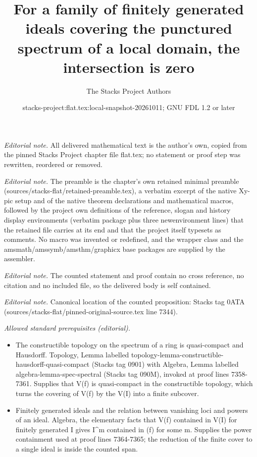 \documentclass[10pt,a4paper]{amsart}
\title{For a family of finitely generated ideals covering the punctured spectrum of a local domain, the intersection is zero}
\author{The Stacks Project Authors}
\date{stacks-project:flat.tex:local-snapshot-20261011; GNU FDL 1.2 or later}
\theoremstyle{plain}
\theoremstyle{definition}
\theoremstyle{remark}
\numberwithin{equation}{subsection}
\begin{document}
\maketitle
\noindent\textit{Editorial note.} All delivered mathematical text is the author's own, copied from the pinned Stacks Project chapter file flat.tex; no statement or proof step was rewritten, reordered or removed.\par\medskip
\noindent\textit{Editorial note.} The preamble is the chapter's own retained minimal preamble (sources/stacks-flat/retained-preamble.tex), a verbatim excerpt of the native Xy-pic setup and of the native theorem declarations and mathematical macros, followed by the project own definitions of the reference, slogan and history display environments (verbatim package plus three newenvironment lines) that the retained file carries at its end and that the project itself typesets as comments. No macro was invented or redefined, and the wrapper class and the amsmath/amssymb/amsthm/graphicx base packages are supplied by the assembler.\par\medskip
\noindent\textit{Editorial note.} The counted statement and proof contain no cross reference, no citation and no included file, so the delivered body is self contained.\par\medskip
\noindent\textit{Editorial note.} Canonical location of the counted proposition: Stacks tag 0ATA (sources/stacks-flat/pinned-original-source.tex line 7344).\par\medskip
\noindent\textit{Allowed standard prerequisites (editorial).}\begin{itemize}
\item The constructible topology on the spectrum of a ring is quasi-compact and Hausdorff. Topology, Lemma labelled topology-lemma-constructible-hausdorff-quasi-compact (Stacks tag 0901) with Algebra, Lemma labelled algebra-lemma-spec-spectral (Stacks tag 090M), invoked at proof lines 7358-7361. Supplies that V(f) is quasi-compact in the constructible topology, which turns the covering of V(f) by the V(I) into a finite subcover.
\item Finitely generated ideals and the relation between vanishing loci and powers of an ideal. Algebra, the elementary facts that V(f) contained in V(I) for finitely generated I gives I\textasciicircum{}m contained in (f) for some m. Supplies the power containment used at proof lines 7364-7365; the reduction of the finite cover to a single ideal is inside the counted span.
\end{itemize}\medskip
\end{document}
